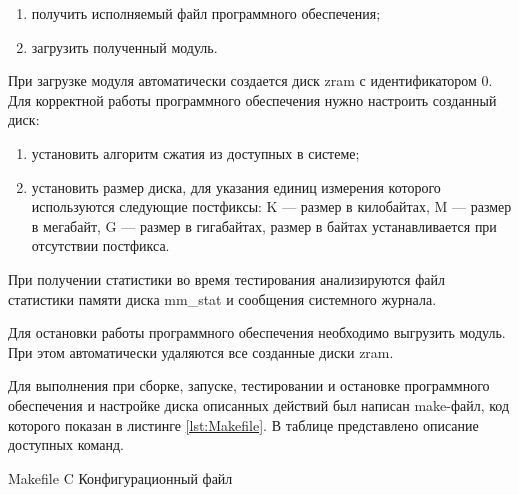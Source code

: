 \begin{enumerate}
    \item получить исполняемый файл программного обеспечения;
    \item загрузить полученный модуль.
\end{enumerate}

При загрузке модуля автоматически создается диск zram с идентификатором 0. Для корректной работы программного обеспечения нужно настроить созданный диск:

\begin{enumerate}
    \item установить алгоритм сжатия из доступных в системе;
    \item установить размер диска, для указания единиц измерения которого используются следующие постфиксы: K --- размер в килобайтах, M --- размер в мегабайт, G --- размер в гигабайтах, размер в байтах устанавливается при отсутствии постфикса.
\end{enumerate}

При получении статистики во время тестирования анализируются файл статистики памяти диска mm\_stat и сообщения системного журнала.

Для остановки работы программного обеспечения необходимо выгрузить модуль. При этом автоматически удаляются все созданные диски zram.

Для выполнения при сборке, запуске, тестировании и остановке программного обеспечения и настройке диска описанных действий был написан make-файл, код которого показан в листинге \ref{lst:Makefile}. В таблице представлено описание доступных команд.

    {Makefile}
    {C}
    {Конфигурационный файл}

